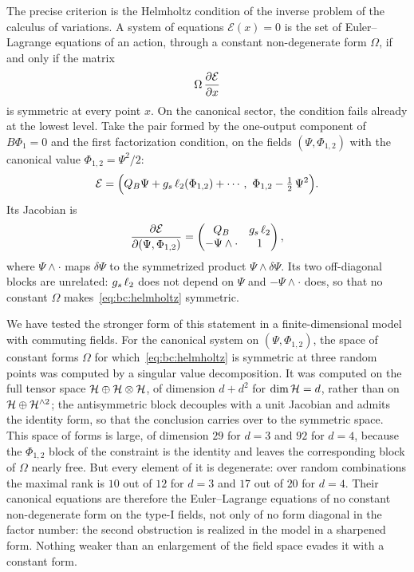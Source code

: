 The precise criterion is the Helmholtz condition of the inverse problem of the calculus of variations.
A system of equations $\mathcal E(x) = 0$ is the set of Euler--Lagrange equations of an action, through a constant non-degenerate form $\Omega$, if and only if the matrix
\begin{equation}
  \label{eq:bc:helmholtz}
  \Omega \, \frac{\partial \mathcal E}{\partial x}
\end{equation}
is symmetric at every point $x$.
On the canonical sector, the condition fails already at the lowest level.
Take the pair formed by the one-output component of $B \Phi_1 = 0$ and the first factorization condition, on the fields $(\Psi, \Phi_{1, 2})$ with the canonical value $\Phi_{1, 2} = \Psi^2 / 2$:
\begin{equation}
  \mathcal E
    = \Big( Q_B \Psi + g_s \, \ell_2(\Phi_{1, 2}) + \cdots, \
      \Phi_{1, 2} - \tfrac{1}{2} \, \Psi^2 \Big).
\end{equation}
Its Jacobian is
\begin{equation}
  \label{eq:bc:jacobian}
  \frac{\partial \mathcal E}{\partial (\Psi, \Phi_{1, 2})}
    = \begin{pmatrix}
      Q_B & g_s \, \ell_2 \\
      - \Psi \wedge \cdot & 1
    \end{pmatrix},
\end{equation}
where $\Psi \wedge \cdot$ maps $\delta \Psi$ to the symmetrized product $\Psi \wedge \delta \Psi$.
Its two off-diagonal blocks are unrelated: $g_s \, \ell_2$ does not depend on $\Psi$ and $- \Psi \wedge \cdot$ does, so that no constant $\Omega$ makes~\eqref{eq:bc:helmholtz} symmetric.

We have tested the stronger form of this statement in a finite-dimensional model with commuting fields.
For the canonical system on $(\Psi, \Phi_{1, 2})$, the space of constant forms $\Omega$ for which~\eqref{eq:bc:helmholtz} is symmetric at three random points was computed by a singular value decomposition.
It was computed on the full tensor space $\mathcal{H} \oplus \mathcal{H} \otimes \mathcal{H}$, of dimension $d + d^2$ for $\dim \mathcal{H} = d$, rather than on $\mathcal{H} \oplus \mathcal{H}^{\wedge 2}$; the antisymmetric block decouples with a unit Jacobian and admits the identity form, so that the conclusion carries over to the symmetric space.
This space of forms is large, of dimension $29$ for $d = 3$ and $92$ for $d = 4$, because the $\Phi_{1, 2}$ block of the constraint is the identity and leaves the corresponding block of $\Omega$ nearly free.
But every element of it is degenerate: over random combinations the maximal rank is $10$ out of $12$ for $d = 3$ and $17$ out of $20$ for $d = 4$.
Their canonical equations are therefore the Euler--Lagrange equations of no constant non-degenerate form on the type-I fields, not only of no form diagonal in the factor number: the second obstruction is realized in the model in a sharpened form.
Nothing weaker than an enlargement of the field space evades it with a constant form.

